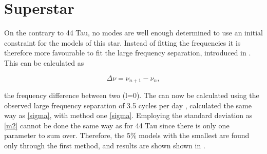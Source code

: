 \begin{figure}[htbp]
	\centering
	\caption{}
	\label{freqfit}
\end{figure}

\section{Superstar}

On the contrary to 44 Tau, no modes are well enough determined to use an initial constraint for the models of this star. Instead of fitting the frequencies it is therefore more favourable to fit the large frequency separation, introduced in . This can be calculated as

\begin{equation}
    \Delta\nu = \nu_{n+1} - \nu_{n},
\end{equation}

\noindent the frequency difference between two (l=0).  The \chis can now be calculated using the observed large frequency separation of 3.5 cycles per day \citep{antoci2014role}, calculated the same way as  \eqref{sigma}, with method one \eqref{sigma}. Employing the standard deviation as \eqref{m2} cannot be done the same way as for 44 Tau since there is only one parameter to sum over. Therefore, the 5\% models with the smallest \chis are found only through the first method, and results are shown shown in .

